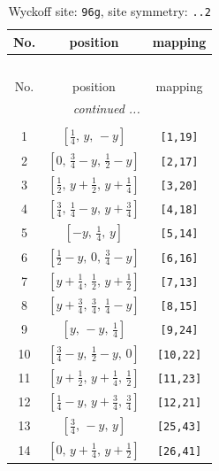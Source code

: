 \documentclass[fleqn,8pt]{jsarticle}
\begin{document}
\begin{longtable}{ccc}
\caption{Wyckoff site: {\tt 96g}, site symmetry: {\tt ..2}}
 \\
 \hline \hline
No. & position & mapping \\ \hline \endfirsthead

\multicolumn{2}{l}{\tablename\ \thetable{}} \\
 \hline \hline
No. & position & mapping \\ \hline \endhead

 \hline \hline
\multicolumn{2}{r}{\footnotesize\it continued ...} \\ \endfoot

 \hline \hline
\multicolumn{2}{r}{} \\ \endlastfoot

1 & $\left[ \frac{1}{4},\, y,\, - y \right]$ & {\tt [1,19]} \\ \hline
2 & $\left[ 0,\, \frac{3}{4} - y,\, \frac{1}{2} - y \right]$ & {\tt [2,17]} \\ \hline
3 & $\left[ \frac{1}{2},\, y + \frac{1}{2},\, y + \frac{1}{4} \right]$ & {\tt [3,20]} \\ \hline
4 & $\left[ \frac{3}{4},\, \frac{1}{4} - y,\, y + \frac{3}{4} \right]$ & {\tt [4,18]} \\ \hline
5 & $\left[ - y,\, \frac{1}{4},\, y \right]$ & {\tt [5,14]} \\ \hline
6 & $\left[ \frac{1}{2} - y,\, 0,\, \frac{3}{4} - y \right]$ & {\tt [6,16]} \\ \hline
7 & $\left[ y + \frac{1}{4},\, \frac{1}{2},\, y + \frac{1}{2} \right]$ & {\tt [7,13]} \\ \hline
8 & $\left[ y + \frac{3}{4},\, \frac{3}{4},\, \frac{1}{4} - y \right]$ & {\tt [8,15]} \\ \hline
9 & $\left[ y,\, - y,\, \frac{1}{4} \right]$ & {\tt [9,24]} \\ \hline
10 & $\left[ \frac{3}{4} - y,\, \frac{1}{2} - y,\, 0 \right]$ & {\tt [10,22]} \\ \hline
11 & $\left[ y + \frac{1}{2},\, y + \frac{1}{4},\, \frac{1}{2} \right]$ & {\tt [11,23]} \\ \hline
12 & $\left[ \frac{1}{4} - y,\, y + \frac{3}{4},\, \frac{3}{4} \right]$ & {\tt [12,21]} \\ \hline
13 & $\left[ \frac{3}{4},\, - y,\, y \right]$ & {\tt [25,43]} \\ \hline
14 & $\left[ 0,\, y + \frac{1}{4},\, y + \frac{1}{2} \right]$ & {\tt [26,41]} \\ \hline

\end{longtable}
\end{document}

